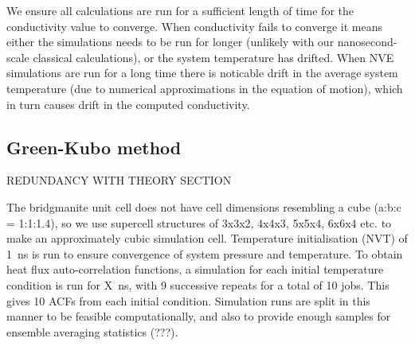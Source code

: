 \documentclass[%
preprint,                                  %
nofootinbib,
 amsmath,amssymb,
 aps,
]{revtex4-1}
\begin{document}


We ensure all calculations are run for a sufficient length of time for the conductivity value to converge. When conductivity fails to converge it means either the simulations needs to be run for longer (unlikely with our nanosecond-scale classical calculations), or the system temperature has drifted. When NVE simulations are run for a long time there is noticable drift in the average system temperature (due to  numerical approximations in the equation of motion), which in turn causes drift in the computed conductivity.



















\subsection{\label{sec:method.gk}Green-Kubo method}

REDUNDANCY WITH THEORY SECTION

The bridgmanite unit cell does not have cell dimensions resembling a cube (a:b:c = 1:1:1.4), so we use supercell structures of 3x3x2, 4x4x3, 5x5x4, 6x6x4 etc. to make an approximately cubic simulation cell. Temperature initialisation (NVT) of 1~ns is run to ensure convergence of system pressure and temperature. To obtain heat flux auto-correlation functions, a simulation for each initial temperature condition is run for X~ns, with 9 successive repeats for a total of 10 jobs. This gives 10 ACFs from each initial condition. Simulation runs are split in this manner to be feasible computationally, and also to provide enough samples for ensemble averaging statistics (???).
\end{document}
